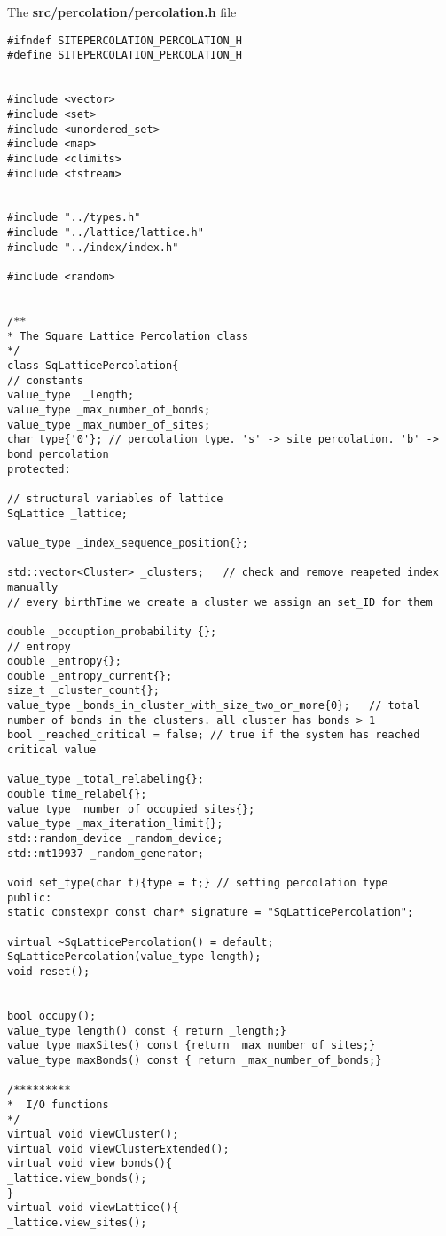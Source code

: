
The \textbf{src/percolation/percolation.h} file

\begin{lstlisting}[style=CStyle]
#ifndef SITEPERCOLATION_PERCOLATION_H
#define SITEPERCOLATION_PERCOLATION_H


#include <vector>
#include <set>
#include <unordered_set>
#include <map>
#include <climits>
#include <fstream>


#include "../types.h"
#include "../lattice/lattice.h"
#include "../index/index.h"

#include <random>


/**
* The Square Lattice Percolation class
*/
class SqLatticePercolation{
// constants
value_type  _length;
value_type _max_number_of_bonds;
value_type _max_number_of_sites;
char type{'0'}; // percolation type. 's' -> site percolation. 'b' -> bond percolation
protected:

// structural variables of lattice
SqLattice _lattice;

value_type _index_sequence_position{};

std::vector<Cluster> _clusters;   // check and remove reapeted index manually
// every birthTime we create a cluster we assign an set_ID for them

double _occuption_probability {};
// entropy
double _entropy{};
double _entropy_current{};
size_t _cluster_count{};
value_type _bonds_in_cluster_with_size_two_or_more{0};   // total number of bonds in the clusters. all cluster has bonds > 1
bool _reached_critical = false; // true if the system has reached critical value

value_type _total_relabeling{};
double time_relabel{};
value_type _number_of_occupied_sites{};
value_type _max_iteration_limit{};
std::random_device _random_device;
std::mt19937 _random_generator;

void set_type(char t){type = t;} // setting percolation type
public:
static constexpr const char* signature = "SqLatticePercolation";

virtual ~SqLatticePercolation() = default;
SqLatticePercolation(value_type length);
void reset();


bool occupy();
value_type length() const { return _length;}
value_type maxSites() const {return _max_number_of_sites;}
value_type maxBonds() const { return _max_number_of_bonds;}

/*********
*  I/O functions
*/
virtual void viewCluster();
virtual void viewClusterExtended();
virtual void view_bonds(){
_lattice.view_bonds();
}
virtual void viewLattice(){
_lattice.view_sites();


\end{lstlisting}
